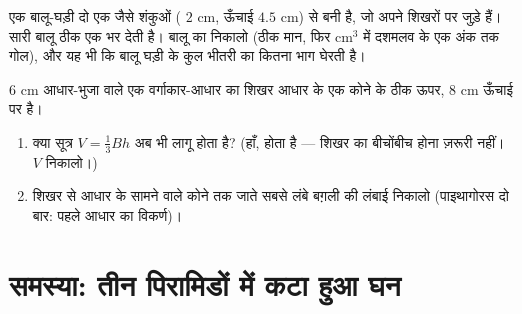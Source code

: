 \begin{exercise}[$\star\star$]\label{exo:g8:solids:10}
एक बालू-घड़ी दो एक जैसे शंकुओं ( $2$ cm, ऊँचाई $4.5$ cm) से
बनी है, जो अपने शिखरों पर जुड़े हैं। सारी बालू ठीक एक  भर देती
है। बालू का  निकालो (ठीक मान, फिर cm$^3$ में दशमलव के एक अंक तक
गोल), और यह भी कि बालू घड़ी के कुल भीतरी  का कितना भाग घेरती है।
\end{exercise}

\begin{exercise}[$\star\star\star$]\label{exo:g8:solids:11}
$6$ cm आधार-भुजा वाले एक वर्गाकार-आधार  का शिखर आधार के एक
कोने के ठीक ऊपर, $8$ cm ऊँचाई पर है।
\begin{enumerate}
  \item क्या सूत्र $V = \frac13 Bh$ अब भी लागू होता है? (हाँ, होता
        है --- शिखर का बीचोंबीच होना ज़रूरी नहीं। $V$ निकालो।)
  \item शिखर से आधार के सामने वाले कोने तक जाते सबसे लंबे बग़ली
         की लंबाई निकालो (पाइथागोरस दो बार: पहले आधार का
        विकर्ण)।
\end{enumerate}
\end{exercise}

\section{समस्या: तीन पिरामिडों में कटा हुआ घन}


